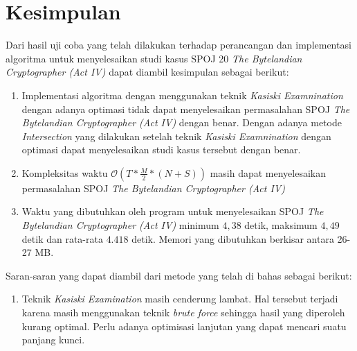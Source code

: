 
\section{Kesimpulan}
Dari hasil uji coba yang telah dilakukan terhadap perancangan dan implementasi algoritma untuk menyelesaikan studi kasus SPOJ 20 \textit{The Bytelandian Cryptographer (Act IV)} dapat diambil kesimpulan sebagai berikut:
\begin{enumerate}
 \item Implementasi algoritma dengan menggunakan teknik \textit{Kasiski Examnination} dengan adanya optimasi tidak dapat menyelesaikan permasalahan SPOJ \textit{The Bytelandian Cryptographer (Act IV)} dengan benar. Dengan adanya metode \textit{Intersection} yang dilakukan setelah teknik \textit{Kasiski Examnination} dengan optimasi dapat menyelesaikan studi kasus tersebut dengan benar.
 \item Kompleksitas waktu $\mathcal{O}(T*\frac{M}{2}*(N+S))$ masih dapat menyelesaikan permasalahan SPOJ \textit{The Bytelandian Cryptographer (Act IV)}
 \item Waktu yang dibutuhkan oleh program untuk menyelesaikan SPOJ \textit{The Bytelandian Cryptographer (Act IV)} minimum $4,38$ detik, maksimum $4,49$ detik dan rata-rata $4.418$ detik. Memori yang dibutuhkan berkisar antara 26-27 MB. %
 \end{enumerate}
Saran-saran yang dapat diambil dari metode yang telah di bahas sebagai berikut:
  \begin{enumerate}
    \item Teknik \textit{Kasiski Examination} masih cenderung lambat. Hal tersebut terjadi karena masih menggunakan teknik \textit{brute force} sehingga hasil yang diperoleh kurang optimal. Perlu adanya optimisasi lanjutan yang dapat mencari suatu panjang kunci.%
    \end{enumerate}


